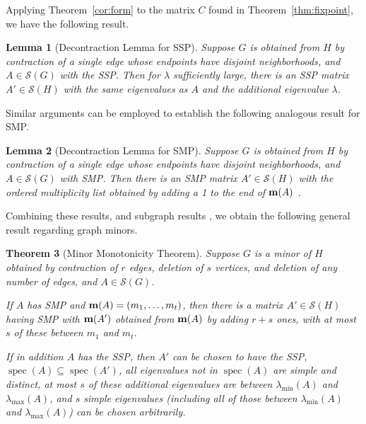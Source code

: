 \documentclass[11pt]{article}
\newtheorem{thm}{Theorem}[section]
\newtheorem{lem}[thm]{Lemma}
\theoremstyle{definition}
\theoremstyle{definition}
\theoremstyle{definition}
\newcommand{\oml}{{\bf m}}
\newcommand{\mptn}{\mathcal{S}} %
\def\spec{\operatorname{spec}}
\begin{document}
Applying Theorem~\ref{cor:form} to the matrix $C$ found in Theorem~\ref{thm:fixpoint}, we have the following result. 

\begin{lem} [Decontraction Lemma for SSP]  \label{decontractSSP}
Suppose  $G$ is obtained from $H$ by contraction of a single edge whose endpoints have disjoint neighborhoods, and $A\in\mptn(G)$ with the SSP.  Then for $\lambda$ sufficiently large,  there is an SSP matrix $A'\in \mptn(H)$ with the same eigenvalues as $A$ and the additional eigenvalue  $\lambda$.  \end{lem}

Similar arguments can be employed to establish the following analogous result for SMP.
 
 
 \begin{lem} [Decontraction Lemma for SMP] \label{decontractSMP}
Suppose  $G$ is obtained from $H$ by contraction of a single edge whose endpoints have disjoint neighborhoods, and $A\in\mptn(G)$ with SMP.  Then there is an SMP matrix $A'\in \mptn(H)$ with the  ordered multiplicity list obtained  by adding a 1 to the end  of  $\oml(A)$ .\end{lem}


Combining these results, and  subgraph results \cite[Theorem~36]{genSAP}, we obtain the following general result 
regarding graph minors.

\begin{thm}[Minor Monotonicity Theorem] \label{minormon}
Suppose  $G$ is a minor of  $H$ obtained by contraction of $r$ edges,  deletion of $s$ vertices, and deletion of any number of edges, and $A\in\mptn(G)$.  

If $A$ has SMP and   $\oml(A)=(m_1,\dots,m_t)$, then  there is a matrix $A'\in \mptn(H)$ having SMP with $\oml(A')$ obtained  from $\oml(A)$ by adding $r+s$ ones,  with at most $s$ of these between $m_1$ and $m_t$. 

If in addition $A$ has the SSP, then $A'$ can be chosen to have the SSP, $\spec(A)\subseteq\spec(A')$, all eigenvalues not in $\spec(A)$ are simple and distinct,  at most $s$ of these additional eigenvalues are between 
$\lambda_{\min}(A)$ and $\lambda_{\max}(A)$,  and $s$  simple eigenvalues (including all of those between 
$\lambda_{\min}(A)$ and $\lambda_{\max}(A)$)  can be chosen arbitrarily. %
\end{thm}




\end{document}
